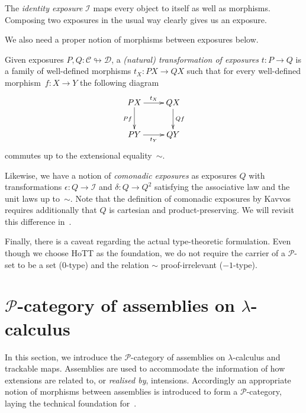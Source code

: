 \documentclass[a4paper,UKenglish,numberwithinsect,cleveref,thm-restate]{lipics-v2021}
\numberwithin{equation}{section}
\newcommand{\PP}{\mathscr{P}}
\theoremstyle{plain}
\begin{document}
The \emph{identity exposure} $\mathcal{I}$ maps every object to itself as well as morphisms.
Composing two exposures in the usual way clearly gives us an exposure. 

We also need a proper notion of morphisms between exposures below.
\begin{definition}
  Given exposures $P, Q\colon \mathscr{C} \looparrowright \mathscr{D}$, a \emph{(natural) transformation of exposures} $t\colon P \to Q$ is a family of well-defined morphisms $t_X \colon PX \to QX$ such that for every well-defined morphism~$f\colon X \to Y$ the following diagram
  \[
    \xymatrix{
      PX \ar[d]_{Pf} \ar[r]^{t_X} & QX \ar[d]^{Qf} \\
      PY \ar[r]_{t_Y} & QY
    }
  \]
  commutes up to the extensional equality~$\sim$.
\end{definition}
Likewise, we have a notion of \emph{comonadic exposures} as exposures $Q$ with transformations $\epsilon\colon Q \to \mathcal{I}$ and $\delta\colon Q \to Q^2$ satisfying the associative law and the unit laws up to~$\sim$.
Note that the definition of comonadic exposures by Kavvos~\cite{Kavvos2017b} requires additionally that $Q$ is cartesian and product-preserving.
We will revisit this difference in~.

Finally, there is a caveat regarding the actual type-theoretic formulation.
Even though we choose HoTT as the foundation, we do not require the carrier of a $\PP$-set to be a set ($0$-type) and the relation $\sim$ proof-irrelevant ($-1$-type). 

\section{\texorpdfstring{$\PP$}{P}-category of assemblies on \texorpdfstring{$\lambda$}{λ}-calculus}\label{sec:assemblies}

In this section, we introduce the $\PP$-category of assemblies on $\lambda$-calculus and trackable maps.
Assemblies are used to accommodate the information of how extensions are related to, or \emph{realised by}, intensions. Accordingly an appropriate notion of morphisms between assemblies is introduced to form a $\PP$-category, laying
the technical foundation for~.
\end{document}
